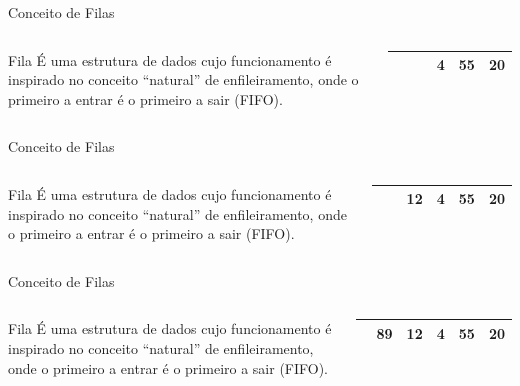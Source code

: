 \documentclass[12pt,table,xcolor={dvipsnames}]{beamer}
\begin{document}
\begin{frame}{Conceito de Filas}
\begin{columns}
\begin{block}{Fila}
É uma estrutura de dados cujo funcionamento é inspirado no conceito “natural” de enfileiramento, onde o primeiro a entrar é o primeiro a sair (FIFO).
\end{block}
\begin{center}
{
\begin{tabular}{ |p{.5cm}|p{.5cm}|p{.5cm}|p{.5cm}|p{.5cm}|p{.5cm}| }
\hline
 &  &  & 4 & 55 & 20 \\ \hline
\end{tabular}
}
\end{center}
\end{columns}
\end{frame}

\begin{frame}{Conceito de Filas}
\begin{columns}
\begin{block}{Fila}
É uma estrutura de dados cujo funcionamento é inspirado no conceito “natural” de enfileiramento, onde o primeiro a entrar é o primeiro a sair (FIFO).
\end{block}
\begin{center}
{
\begin{tabular}{ |p{.5cm}|p{.5cm}|p{.5cm}|p{.5cm}|p{.5cm}|p{.5cm}| }
\hline
 &  & 12 & 4 & 55 & 20 \\ \hline
\end{tabular}
}
\end{center}
\end{columns}
\end{frame}

\begin{frame}{Conceito de Filas}
\begin{columns}
\begin{block}{Fila}
É uma estrutura de dados cujo funcionamento é inspirado no conceito “natural” de enfileiramento, onde o primeiro a entrar é o primeiro a sair (FIFO).
\end{block}
\begin{center}
{
\begin{tabular}{ |p{.5cm}|p{.5cm}|p{.5cm}|p{.5cm}|p{.5cm}|p{.5cm}| }
\hline
 & 89 & 12 & 4 & 55 & 20 \\ \hline
\end{tabular}
}
\end{center}
\end{columns}
\end{frame}
\end{document}

